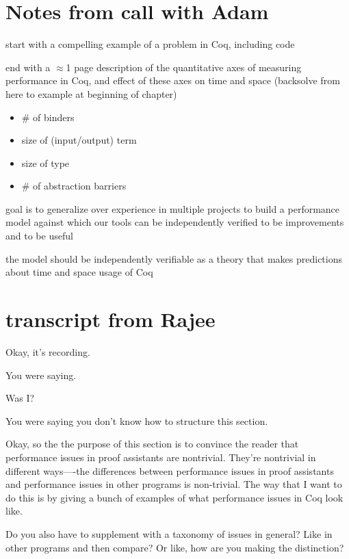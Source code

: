 \begin{subappendices}
    
    \section{Notes from call with Adam}
    start with a compelling example of a problem in Coq, including code
    
    end with a $\approx$1 page description of the quantitative axes of measuring performance in Coq, and effect of these axes on time and space (backsolve from here to example at beginning of chapter)
    \begin{itemize}
        \item \# of binders
        \item size of (input/output) term
        \item size of type
        \item \# of abstraction barriers
    \end{itemize}
    
    goal is to generalize over experience in multiple projects to build a performance model against which our tools can be independently verified to be improvements and to be useful
    
    the model should be independently verifiable as a theory that makes predictions about time and space usage of Coq
    
    \section{transcript from Rajee}
    
    
    Okay, it's recording. 
    
    You were saying.
    
    Was I?
    
    You were saying you don't know how to structure this section.
    
    Okay, so the the purpose of this section is to convince the reader that performance issues in proof assistants are nontrivial.  They're nontrivial in different ways----the differences between performance issues in proof assistants and performance issues in other programs is non-trivial. The way that I want to do this is by giving a bunch of examples of what performance issues in Coq look like.
    
    Do you also have to supplement with a taxonomy of issues in general? Like in other programs and then compare? Or like, how are you making the distinction? 
    

\end{subappendices}
